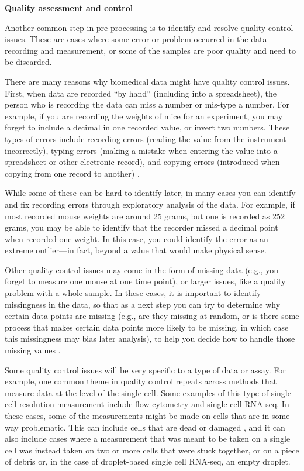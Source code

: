 \documentclass[]{tufte-book}
\begin{document}
\textbf{Quality assessment and control}

Another common step in pre-processing is to identify and resolve quality control
issues. These are cases where some error or problem occurred in the data
recording and measurement, or some of the samples are poor quality and need to
be discarded.

There are many reasons why biomedical data might have quality control
issues. First, when data are recorded ``by hand'' (including into a spreadsheet),
the person who is recording the data can miss a number or mis-type a number. For
example, if you are recording the weights of mice for an experiment, you may
forget to include a decimal in one recorded value, or invert two numbers. These
types of errors include recording errors (reading the value from the instrument
incorrectly), typing errors (making a mistake when entering the value into a
spreadsheet or other electronic record), and copying errors (introduced when
copying from one record to another) \citep{chatfield1995problem}.

While some of these can be hard to identify later, in many cases you can
identify and fix recording errors through exploratory analysis of the data. For
example, if most recorded mouse weights are around 25 grams, but one is recorded
as 252 grams, you may be able to identify that the recorder missed a decimal point
when recorded one weight. In this case, you could identify the error as
an extreme outlier---in fact, beyond a value that would make physical sense.

Other quality control issues may come in the form of missing data (e.g., you
forget to measure one mouse at one time point), or larger issues, like a quality
problem with a whole sample. In these cases, it is important to
identify missingness in the data, so that as a next step you can try to
determine why certain data points are missing (e.g., are they missing at random,
or is there some process that makes certain data points more likely to be
missing, in which case this missingness may bias later analysis), to help you
decide how to handle those missing values \citep{chatfield1995problem}.

Some quality control issues will be very specific to a type of data or assay.
For example, one common theme in quality control repeats across methods
that measure data at the level of the single cell. Some examples of this type of
single-cell resolution measurement include flow cytometry and single-cell
RNA-seq. In these cases, some of the measurements might be made on cells that
are in some way problematic. This can include cells that are dead or damaged
\citep{ilicic2016classification}, and it can also include cases where a measurement
that was meant to be taken on a single cell was instead taken on two or more
cells that were stuck together, or on a piece of debris or, in the case of
droplet-based single cell RNA-seq, an empty droplet.
\end{document}

